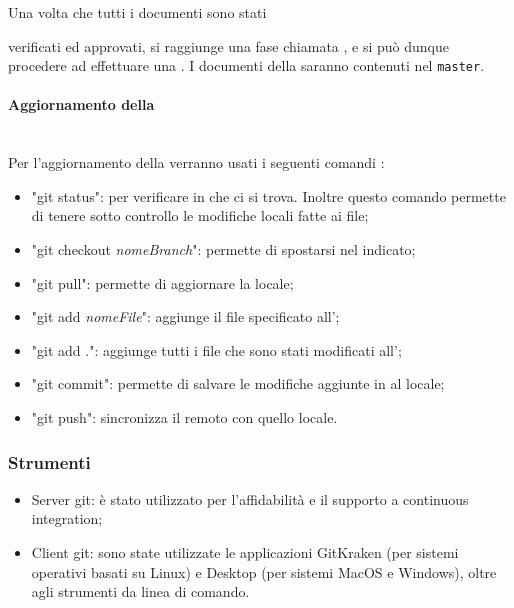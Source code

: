 Una volta che tutti i documenti sono stati {verificati ed approvati, si raggiunge una fase chiamata , e si può dunque procedere ad effettuare una . 
I documenti della saranno contenuti nel  \texttt{master}.
\paragraph{Aggiornamento della }\mbox{}\\[0.4cm]
Per l’aggiornamento della  verranno usati i seguenti comandi :
\begin{itemize}
    \item "git status": per verificare in che  ci si trova. Inoltre questo    comando permette di tenere sotto controllo le modifiche locali fatte ai file;
    \item "git checkout \emph{nomeBranch}": permette di spostarsi nel  indicato;
    \item "git pull": permette di aggiornare la  locale;
    \item "git add \emph{nomeFile}": aggiunge il file specificato all';
    \item "git add .": aggiunge tutti i file che sono stati modificati all';
    \item "git commit": permette di salvare le modifiche aggiunte in  al  locale;
    \item "git push": sincronizza il  remoto con quello locale.
\end{itemize}
\subsubsection{Strumenti}
\begin{itemize}
    \item Server git: è stato utilizzato  per l’affidabilità e il supporto a continuous integration;
    \item Client git: sono state utilizzate le applicazioni GitKraken (per sistemi operativi basati su Linux) e  Desktop (per sistemi MacOS e Windows), oltre agli strumenti da linea di comando.
\end{itemize}
}
